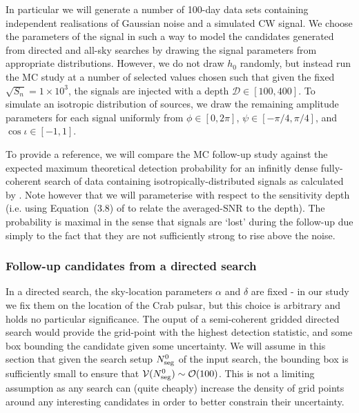 \documentclass[aps, prd, twocolumn, superscriptaddress, floatfix, showpacs, nofootinbib, longbibliography]{revtex4-1}
\begin{document}
In particular we will generate a number of 100-day data sets containing
independent realisations of Gaussian noise and a simulated CW signal. We choose
the parameters of the signal in such a way to model the candidates generated
from directed and all-sky searches by drawing the signal parameters from
appropriate distributions. However, we do not draw $h_0$ randomly, but instead
run the MC study at a number of selected values chosen such that given the
fixed $\sqrt{S_n}=1\times10^{3}$, the signals are injected with a depth
$\mathcal{D} \in [100, 400]$.  To simulate an isotropic distribution of
sources, we draw the remaining amplitude parameters for each signal uniformly
from $\phi \in [0, 2\pi]$, $\psi \in [-\pi/4, \pi/4]$, and $\cos\iota \in [-1,
1]$.

To provide a reference, we will compare the MC follow-up study against the
expected maximum theoretical detection probability for an infinitly dense
fully-coherent search of data containing isotropically-distributed signals as
calculated by \citet{wette2012}. Note however that we will parameterise with
respect to the sensitivity depth (i.e. using Equation~(3.8) of \citet{wette2012} to
relate the averaged-SNR to the depth). The probability is maximal in the
sense that signals are `lost' during the follow-up due simply to the fact that
they are not sufficiently strong to rise above the noise.


\subsubsection{Follow-up candidates from a directed search}
\label{sec_directed_follow_up}

In a directed search, the sky-location parameters $\alpha$ and $\delta$ are
fixed - in our study we fix them on the location of the Crab pulsar, but this
choice is arbitrary and holds no particular significance. The ouput of a
semi-coherent gridded directed search would provide the grid-point with the
highest detection statistic, and some box bounding the candidate given some
uncertainty. We will assume in this section that given the search setup
$N_{\rm seg}^{0}$ of the input search, the bounding box is sufficiently small to
ensure that $\mathcal{V}(N_{\rm seg}^0)\sim \mathcal{O}(100)$. This is not a limiting
assumption as any search can (quite cheaply) increase the density of grid
points around any interesting candidates in order to better constrain their
uncertainty.
\end{document}
